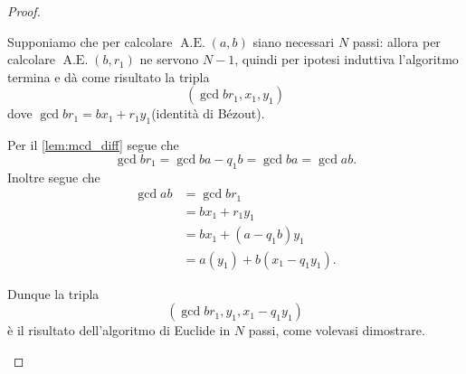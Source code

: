 \begin{proof}
\begin{description}
\begin{description}
            Supponiamo che per calcolare $\operatorname{A.E.}(a, b)$ siano necessari $N$ passi: allora per calcolare $\operatorname{A.E.}(b, r_1)$ ne servono $N-1$, quindi per ipotesi induttiva l'algoritmo termina e dà come risultato la tripla \[
                (\gcd{b}{r_1}, x_1, y_1) 
            \] dove $\gcd{b}{r_1} = bx_1 + r_1y_1$(identità di Bézout).

            Per il \autoref{lem:mcd_diff} segue che \[
                \gcd{b}{r_1} = \gcd{b}{a - q_1b} = \gcd{b}{a} = \gcd{a}{b}.
            \] Inoltre segue che \begin{align*}
                \gcd{a}{b} &= \gcd{b}{r_1} \\
                &= bx_1 + r_1y_1 \\
                &= bx_1 + (a - q_1b)y_1 \\
                &= a(y_1) + b(x_1 - q_1y_1).
            \end{align*}

            Dunque la tripla \[
                (\gcd{b}{r_1}, y_1, x_1 - q_1y_1)    
            \] è il risultato dell'algoritmo di Euclide in $N$ passi, come volevasi dimostrare. \qedhere
        \end{description} 
    \end{description}
\end{proof}